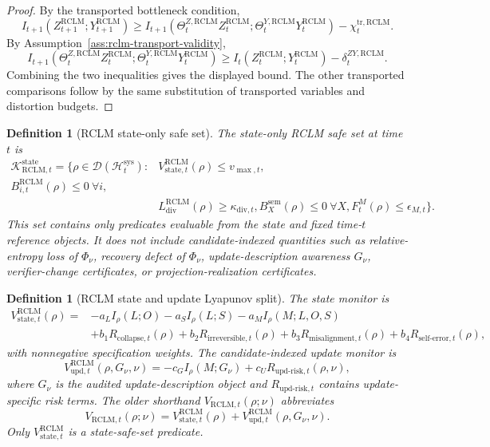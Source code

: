 \documentclass[11pt,a4paper]{article}
\newtheorem{definition}[theorem]{Definition}
\newcommand{\D}{\mathcal D}
\newcommand{\Hcal}{\mathcal H}
\newcommand{\Kcal}{\mathcal K}
\newcommand{\RCLM}{\mathrm{RCLM}}
\newcommand{\sem}{\mathrm{sem}}
\newcommand{\sys}{\mathrm{sys}}
\newcommand{\state}{\mathrm{state}}
\newcommand{\collapse}{\mathrm{collapse}}
\newcommand{\irreversible}{\mathrm{irreversible}}
\newcommand{\misalignment}{\mathrm{misalignment}}
\newcommand{\selferror}{\mathrm{self\mbox{-}error}}
\begin{document}
\begin{proof}
By the transported bottleneck condition,
\[
I_{t+1}(Z_{t+1}^{\RCLM};Y_{t+1}^{\RCLM})
\ge
I_{t+1}(\Theta_t^{Z,\RCLM}Z_t^{\RCLM};\Theta_t^{Y,\RCLM}Y_t^{\RCLM})-
\chi_t^{\mathrm{tr},\RCLM}.
\]
By Assumption~\ref{ass:rclm-transport-validity},
\[
I_{t+1}(\Theta_t^{Z,\RCLM}Z_t^{\RCLM};\Theta_t^{Y,\RCLM}Y_t^{\RCLM})
\ge
I_t(Z_t^{\RCLM};Y_t^{\RCLM})-
\delta_t^{ZY,\RCLM}.
\]
Combining the two inequalities gives the displayed bound.  The other transported comparisons follow by the same substitution of transported variables and distortion budgets.
\end{proof}

\begin{definition}[RCLM state-only safe set]
\label{def:rclm-state-only-safe-set}
The state-only RCLM safe set at time \(t\) is
\[
\begin{aligned}
\Kcal_{\RCLM,t}^{\state}
=
\{\rho\in\D(\Hcal_t^{\sys}):{}&
V_{\mathrm{state},t}^{\RCLM}(\rho)\le v_{\max,t},\\
B_{i,t}^{\RCLM}(\rho)\le0\ \forall i,\\
&L_{\mathrm{div}}^{\RCLM}(\rho)\ge\kappa_{\mathrm{div},t},
B_X^{\sem}(\rho)\le0\ \forall X,
F_t^M(\rho)\le\epsilon_{M,t}
\}.
\end{aligned}
\]
This set contains only predicates evaluable from the state and fixed time-\(t\) reference objects.  It does not include candidate-indexed quantities such as relative-entropy loss of \(\Phi_\nu\), recovery defect of \(\Phi_\nu\), update-description awareness \(G_\nu\), verifier-change certificates, or projection-realization certificates.
\end{definition}

\begin{definition}[RCLM state and update Lyapunov split]
\label{def:rclm-state-update-lyapunov-split}
The state monitor is
\[
\begin{aligned}
V_{\mathrm{state},t}^{\RCLM}(\rho)
={}&
-a_L I_\rho(L;O)-a_S I_\rho(L;S)-a_M I_\rho(M;L,O,S)\\
&+b_1R_{\collapse,t}(\rho)+b_2R_{\irreversible,t}(\rho)
+b_3R_{\misalignment,t}(\rho)+b_4R_{\selferror,t}(\rho),
\end{aligned}
\]
with nonnegative specification weights.  The candidate-indexed update monitor is
\[
V_{\mathrm{upd},t}^{\RCLM}(\rho,G_\nu,\nu)
=
-c_G I_\rho(M;G_\nu)+c_U R_{\mathrm{upd\mbox{-}risk},t}(\rho,\nu),
\]
where \(G_\nu\) is the audited update-description object and \(R_{\mathrm{upd\mbox{-}risk},t}\) contains update-specific risk terms.  The older shorthand \(V_{\RCLM,t}(\rho;\nu)\) abbreviates
\[
V_{\RCLM,t}(\rho;\nu)
=
V_{\mathrm{state},t}^{\RCLM}(\rho)+V_{\mathrm{upd},t}^{\RCLM}(\rho,G_\nu,\nu).
\]
Only \(V_{\mathrm{state},t}^{\RCLM}\) is a state-safe-set predicate.
\end{definition}
\end{document}
